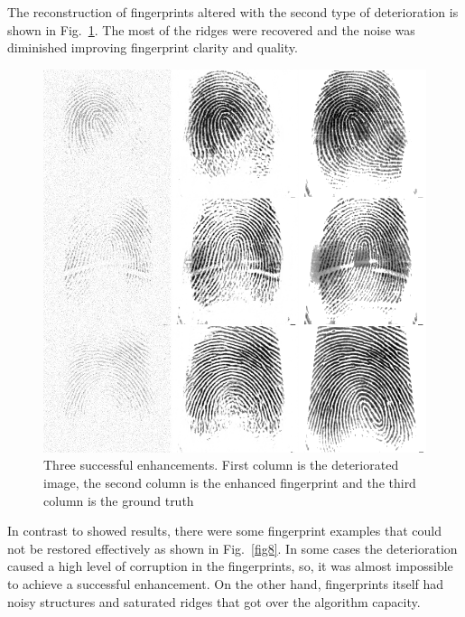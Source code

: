 \documentclass[a4paper,fleqn]{cas-dc}
\begin{document}
The reconstruction of fingerprints altered with the second type of deterioration is shown in Fig.~\ref{fig7}. The most of the ridges were recovered and the noise was diminished improving fingerprint clarity and quality.

\begin{figure}[htbp]
\centerline{\includegraphics[scale=0.28]{figs/recons_2.png}}
\caption{Three successful enhancements. First column is the deteriorated image, the second column is the enhanced fingerprint and the third column is the ground truth}
\label{fig7}
\end{figure}

In contrast to showed results, there were some fingerprint examples that could not be restored effectively as shown in Fig.~\ref{fig8}. In some cases the deterioration caused a high level of corruption in the fingerprints, so, it was almost impossible to achieve a successful enhancement. On the other hand, fingerprints itself had noisy structures and saturated ridges that got over the algorithm capacity.
\end{document}
